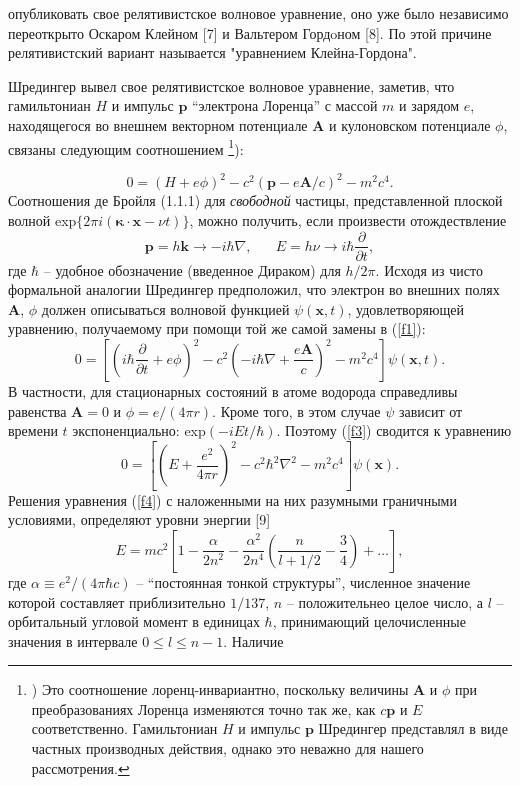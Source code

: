 \documentclass[a5paper,8pt]{article}
\begin{document}
\sloppy
\pagestyle{fancy}
\noindent
опубликовать свое релятивистское волновое уравнение, оно уже было независимо переоткрыто Оскаром Клейном [7] и Вальтером Гордoном  [8]. По этой причине релятивистский вариант называется "уравнением Клейна-Гордона".

Шредингер вывел свое релятивистское волновое уравнение, заметив, что гамильтониан $H$ и импульс $\mathbf{p}$ ``электрона Лоренца'' с массой $m$ и зарядом $e$, находящегося во внешнем векторном потенциале $\mathbf{A}$ и кулоновском потенциале $\phi$, связаны следующим соотношением \footnote{) Это соотношение лоренц-инвариантно, поскольку величины $\mathbf{A}$ и $\phi$ при преобразованиях Лоренца изменяются точно так же, как $c \mathbf{p}$ и $E$ соответственно. Гамильтониан $H$ и импульс $\mathbf{p}$ Шредингер представлял в виде частных производных действия, однако это неважно для нашего рассмотрения.}):

\begin{equation}\label{f1}
0 = (H + e \phi)^2 - c^2 (\mathbf{p} - e \mathbf{A}/c)^2 - m^2 c^4 .
\end{equation}
Соотношения де Бройля (1.1.1) для \textit{свободной} частицы, представленной плоской волной exp$\{2\pi i(\mathbf{\kappa} \cdot \mathbf{x} - \nu t)\}$, можно получить, если произвести отождествление
\begin{equation}\label{f2}
\mathbf{p} = h \mathbf{k} \to -i \hbar \nabla, \, \, \, \, \, \, \, \, \, \, E = h \nu \to i \hbar \frac{\partial}{\partial t} ,
\end{equation}
где $\hbar$ -- удобное обозначение (введенное Дираком) для $h/2\pi$. Исходя из чисто формальной аналогии Шредингер предположил, что электрон во внешних полях \textbf{A}, $\phi$ должен описываться волновой функцией $\psi(\mathbf{x}, t)$, удовлетворяющей уравнению, получаемому при помощи той же самой замены в (\ref{f1}):
\begin{equation}\label{f3}
0 = \left[\left(i \hbar \frac{\partial}{\partial t} + e \phi\right)^2 - c^2 \left(-i \hbar \nabla + \frac{e \mathbf{A}}{c}\right)^2 - m^2 c^4\right] \psi(\mathbf{x}, t) .
\end{equation}
В частности, для стационарных состояний в атоме водорода справедливы равенства $\mathbf{A} = 0$ и $\phi = e/(4\pi r)$. Кроме того, в этом случае $\psi$ зависит от времени $t$ экспоненциально: exp$(-i E t/\hbar)$. Поэтому (\ref{f3}) сводится к уравнению
\begin{equation}\label{f4}
0 = \left[\left(E + \frac{e^2}{4 \pi r}\right)^2 - c^2 \hbar^2 \nabla^2 - m^2 c^4\right] \psi(\mathbf{x}) .
\end{equation}
Решения уравнения (\ref{f4}) с наложенными на них разумными граничными условиями, определяют уровни энергии [9]
\begin{equation}\label{f5}
E = m c^2 \left[1 - \frac{\alpha}{2 n^2} - \frac{\alpha^2}{2 n^4} \left(\frac{n}{l + 1/2} - \frac{3}{4}\right) + \ldots\right],
\end{equation}
где $\alpha \equiv e^2 / (4 \pi \hbar c)$ -- ``постоянная тонкой структуры'', численное значение которой составляет приблизительно $1/137$, $n$ -- положительнео целое число, а $l$ -- орбитальный угловой момент в единицах $\hbar$, принимающий целочисленные значения в интервале $0 \le l \le n - 1$. Наличие
\end{document}

